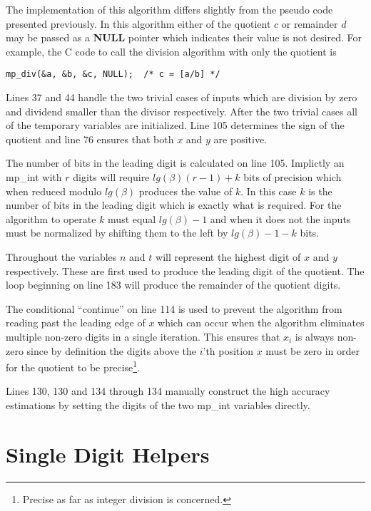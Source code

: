 \documentclass[b5paper]{book}
\begin{document}
The implementation of this algorithm differs slightly from the pseudo code presented previously.  In this algorithm either of the quotient $c$ or
remainder $d$ may be passed as a \textbf{NULL} pointer which indicates their value is not desired.  For example, the C code to call the division
algorithm with only the quotient is 

\begin{verbatim}
mp_div(&a, &b, &c, NULL);  /* c = [a/b] */
\end{verbatim}

Lines 37 and 44 handle the two trivial cases of inputs which are division by zero and dividend smaller than the divisor 
respectively.  After the two trivial cases all of the temporary variables are initialized.  Line 105 determines the sign of 
the quotient and line 76 ensures that both $x$ and $y$ are positive.  

The number of bits in the leading digit is calculated on line 105.  Implictly an mp\_int with $r$ digits will require $lg(\beta)(r-1) + k$ bits
of precision which when reduced modulo $lg(\beta)$ produces the value of $k$.  In this case $k$ is the number of bits in the leading digit which is
exactly what is required.  For the algorithm to operate $k$ must equal $lg(\beta) - 1$ and when it does not the inputs must be normalized by shifting
them to the left by $lg(\beta) - 1 - k$ bits.

Throughout the variables $n$ and $t$ will represent the highest digit of $x$ and $y$ respectively.  These are first used to produce the 
leading digit of the quotient.  The loop beginning on line 183 will produce the remainder of the quotient digits.

The conditional ``continue'' on line 114 is used to prevent the algorithm from reading past the leading edge of $x$ which can occur when the
algorithm eliminates multiple non-zero digits in a single iteration.  This ensures that $x_i$ is always non-zero since by definition the digits
above the $i$'th position $x$ must be zero in order for the quotient to be precise\footnote{Precise as far as integer division is concerned.}.  

Lines 130, 130 and 134 through 134 manually construct the high accuracy estimations by setting the digits of the two mp\_int 
variables directly.  

\section{Single Digit Helpers}
\end{document}
